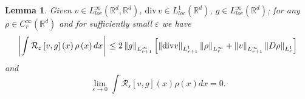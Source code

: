 \documentclass[a4paper,11pt]{article}
\newtheorem{lemma}[theorem]{Lemma}
\begin{document}
\begin{lemma} \label{comm}
Given $v\in L_{loc}^{\infty }\left( \mathbb{R}^{d},\mathbb{R}^{d}\right) $, $%
{\mathrm{div}\,}v\in L_{loc}^{1}\left( \mathbb{R}^{d}\right) $,
$g\in L_{loc}^{\infty }\left( \mathbb{R}^{d}\right) $;
for any $\rho \in C_{r}^{\infty }(\mathbb{R}^{d})$ and for
sufficiently small $\varepsilon $ we have
\begin{equation*}
\left| \int \mathcal{R}_{\varepsilon }\left[ v,g\right] \left(
x\right) \rho
\left( x\right) dx\right|  \\
\leq 2\left\| g\right\| _{L_{r+1}^{\infty }}\left[ \left\| {\mathrm{div}}%
v\right\| _{L_{r+1}^{1}}\left\| \rho \right\| _{L_{r}^{\infty
}}+\left\| v\right\| _{L_{r+1}^{\infty }}\left\| D\rho \right\|
_{L_{r}^{1}}\right]
\end{equation*}
and
\begin{equation*}
\lim_{\varepsilon \rightarrow 0}\int \mathcal{R}_{\varepsilon }\left[ v,g%
\right] \left( x\right) \rho \left( x\right) dx=0.
\end{equation*}
\end{lemma}
\end{document}
